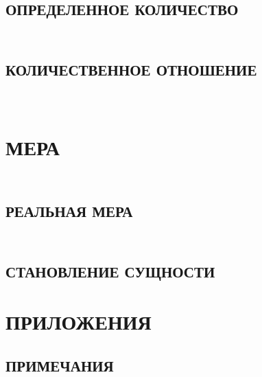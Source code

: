 \documentclass[b5paper, 11pt, twoside, onecolumn, openany]{memoir}
\newcommand{\hegchapter}[3][]{%
  \chapter[#1]{\fontsize{11}{18}\selectfont{\em\mdseries #2}\\#3}}
\begin{document}
\hegchapter[{\em Вторая глава.} Определенное количество]%
  {Вторая глава}{ОПРЕДЕЛЕННОЕ КОЛИЧЕСТВО}


\hegchapter[{\em Третья глава.} Количественное отношение]%
  {Третья глава}{КОЛИЧЕСТВЕННОЕ ОТНОШЕНИЕ}



\part[\small МЕРА]%
     {\fontsize{9}{11}\selectfont{\mdseries ТРЕТИЙ ОТДЕЛ}\\%
      \normalsize МЕРА}


\hegchapter[{\em Вторая глава.} Реальная мера]%
  {Вторая глава}{РЕАЛЬНАЯ МЕРА}


\hegchapter[{\em Третья глава.} Становление сущности]%
  {Третья глава}{СТАНОВЛЕНИЕ СУЩНОСТИ}


\backmatter


\part*[Приложения]{ПРИЛОЖЕНИЯ}


\clearpage

\chapter[\mdseries Примечания]{ПРИМЕЧАНИЯ}



\clearpage
\tableofcontents*
\clearpage
\end{document}
